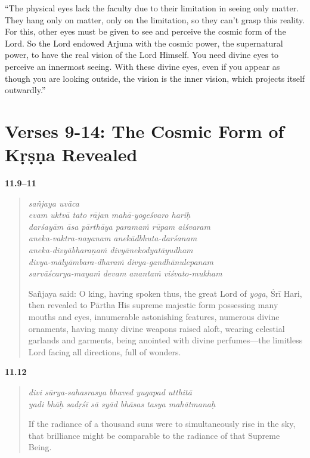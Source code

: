 \enquote{The physical eyes lack the faculty due to their limitation in seeing only matter. They hang only on matter, only on the limitation, so they can’t grasp this reality. For this, other eyes must be given to see and perceive the cosmic form of the Lord. So the Lord endowed Arjuna with the cosmic power, the supernatural power, to have the real vision of the Lord Himself. You need divine eyes to perceive an innermost seeing. With these divine eyes, even if you appear as though you are looking outside, the vision is the inner vision, which projects itself outwardly.}

\newpage
\section{Verses 9-14: The Cosmic Form of Kṛṣṇa Revealed}\label{sec-verses-9-14-the-cosmic-form-of-krsna-revealed}


\par\noindent\textbf{11.9–11}\par
\begin{verse}
\textit{sañjaya uvāca} \\
\textit{evam uktvā tato rājan mahā-yogeśvaro hariḥ} \\
\textit{darśayām āsa pārthāya paramaṁ rūpam aiśvaram} \\
\textit{aneka-vaktra-nayanam anekādbhuta-darśanam} \\
\textit{aneka-divyābharaṇaṁ divyānekodyatāyudham} \\
\textit{divya-mālyāmbara-dharaṁ divya-gandhānulepanam} \\
\textit{sarvāścarya-mayaṁ devam anantaṁ viśvato-mukham}

\noindent Sañjaya said: O king, having spoken thus, the great Lord of \textit{yoga}, Śrī Hari, then revealed to Pārtha His supreme majestic form possessing many mouths and eyes, innumerable astonishing features, numerous divine ornaments, having many divine weapons raised aloft, wearing celestial garlands and garments, being anointed with divine perfumes---the limitless Lord facing all directions, full of wonders.
\end{verse}
\par



\par\noindent\textbf{11.12}\par
\begin{verse}
\textit{divi sūrya-sahasrasya bhaved yugapad utthitā} \\
\textit{yadi bhāḥ sadṛśī sā syād bhāsas tasya mahātmanaḥ}

\noindent If the radiance of a thousand suns were to simultaneously rise in the sky, that brilliance might be comparable to the radiance of that Supreme Being.
\end{verse}
\par



